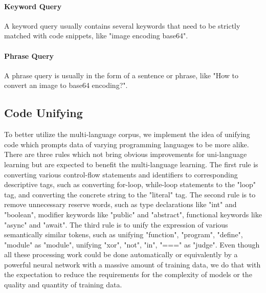 \paragraph{Keyword Query} A keyword query usually contains several keywords that need to be strictly matched with code snippets, like "image encoding base64".

\paragraph{Phrase Query} A phrase query is usually in the form of a sentence or phrase, like "How to convert an image to base64 encoding?".

\subsection{Code Unifying}

To better utilize the multi-language corpus, we implement the idea of unifying code which prompts data of varying programming languages to be more alike. There are three rules which not bring obvious improvements for uni-language learning but are expected to benefit the multi-language learning. The first rule is converting various control-flow statements and identifiers to corresponding descriptive tags, such as converting for-loop, while-loop statements to the "loop" tag, and converting the concrete string to the "literal" tag. The second rule is to remove unnecessary reserve words, such as type declarations like "int" and "boolean", modifier keywords like "public" and "abstract", functional keywords like "async" and "await". The third rule is to unify the expression of various semantically similar tokens, such as unifying "function", "program", "define", "module" as "module", unifying "xor", "not", "in", "===" as "judge". Even though all these processing work could be done automatically or equivalently by a powerful neural network with a massive amount of training data, we do that with the expectation to reduce the requirements for the complexity of models or the quality and quantity of training data.
